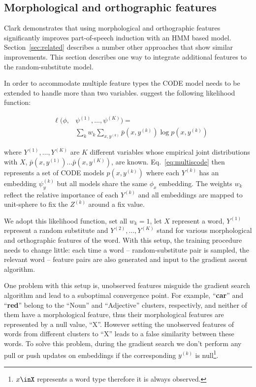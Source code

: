 \subsection{Morphological and orthographic features}
\label{sec:feat}

Clark  demonstrates that
using morphological and orthographic features significantly improves
part-of-speech induction with an HMM based model.
Section~\ref{sec:related} describes a number other approaches that
show similar improvements.  This section describes one way to
integrate additional features to the random-substitute model.

In order to accommodate multiple feature types the CODE model needs to
be extended to handle more than two variables.
\cite{globerson2007euclidean} suggest the following likelihood
function:

\begin{eqnarray}
&\ell(\phi,& \psi^{(1)}, \ldots, \psi^{(K)}) = \label{eq:multiscode}\\
&&\sum_k w_k \sum_{x,y^{(k)}} \bar{p}(x,y^{(k)}) \log p(x,y^{(k)}) \nonumber
\end{eqnarray}

\noindent where $Y^{(1)}, \ldots, Y^{(K)}$ are $K$ different variables
whose empirical joint distributions with $X$,
$\bar{p}(x,y^{(1)})\ldots\bar{p}(x,y^{(K)})$, are known.
Eq.~\ref{eq:multiscode} then represents a set of CODE models
$p(x,y^{(k)})$ where each $Y^{(k)}$ has an embedding $\psi_y^{(k)}$
but all models share the same $\phi_x$ embedding.  The weights $w_k$
reflect the relative importance of each $Y^{(k)}$ and all embeddings
are mapped to unit-sphere to fix the $Z^{(k)}$ around a fix value.

We adopt this likelihood function, set all $w_k=1$, let $X$
represent a word, $Y^{(1)}$ represent a random substitute and
$Y^{(2)}, \ldots, Y^{(K)}$ stand for various morphological and
orthographic features of the word.  With this setup, the training
procedure needs to change little: each time a word --
random-substitute pair is sampled, the relevant word -- feature pairs
are also generated and input to the gradient ascent algorithm.

One problem with this setup is, unobserved features misguide the
gradient search algorithm and lead to a suboptimal convergence point.
For example, ``\textbf{car}'' and ``\textbf{red}'' belong to the ``Noun''
and ``Adjective'' clusters, respectivly, and neither of them have a
morphological feature, thus their morphological features are
represented by a null value, ``X''.  However setting the unobserved
features of words from different clusters to ``X'' leads to a false
similarity between these words.  To solve this problem, during the
gradient search we don't perform any pull or push updates on
embeddings if the corresponding $y^{(k)}$ is null\footnote{$x\inX$
  represents a word type therefore it is always observed.}.

